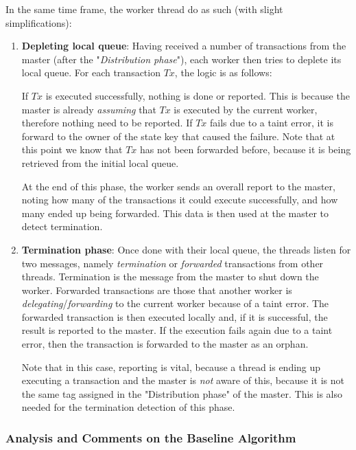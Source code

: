 In the same time frame, the worker thread do as such (with slight simplifications):

\begin{enumerate}
	\item \textbf{Depleting local queue}: Having received a number of transactions from the master
	(after the "\textit{Distribution phase}"), each worker then tries to deplete its local queue.
	For each transaction $Tx$, the logic is as follows:

	If $Tx$ is executed successfully, nothing is done or reported. This is because the master is
	already \textit{assuming} that $Tx$ is executed by the current worker, therefore nothing need to
	be reported. If $Tx$ fails due to a taint error, it is forward to the owner of the state key
	that caused the failure. Note that at this point we know that $Tx$ has not been forwarded
	before, because it is being retrieved from the initial local queue.

	At the end of this phase, the worker sends an overall report to the master, noting how many
	of the transactions it could execute successfully, and how many ended up being forwarded. This
	data is then used at the master to detect termination.

	\item \textbf{Termination phase}: Once done with their local queue, the threads listen for
	two messages, namely \textit{termination} or \textit{forwarded} transactions from other threads.
	Termination is the message from the master to shut down the worker. Forwarded transactions are
	those that another worker  is \textit{delegating}/\textit{forwarding} to the current
	worker because of a taint error. The forwarded transaction is then executed locally and, if it is
	successful, the result is reported to the master. If the execution fails again due to a taint
	error, then the transaction is forwarded to the master as an orphan.

	Note that in this case, reporting is vital, because a thread is ending up executing a
	transaction and the master is \textit{not} aware of this, because it is not the same tag
	assigned in the "Distribution phase" of the master. This is also needed for the termination
	detection of this phase.
\end{enumerate}

\subsubsection{Analysis and Comments on the Baseline Algorithm} \label{chap_approach:subsec:comment_baseline}

